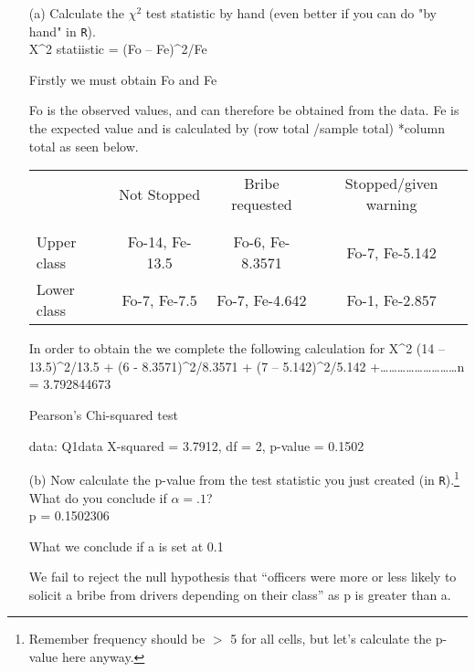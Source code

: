 \documentclass[12pt,letterpaper]{article}
\begin{document}
\begin{enumerate}
	
	\item [(a)]
	Calculate the $\chi^2$ test statistic by hand (even better if you can do "by hand" in \texttt{R}).\\
	\vspace{1cm}
	 X^2 statiistic = (Fo – Fe)^2/Fe 
	 
	 Firstly we must obtain Fo and Fe 
	 
	 Fo is the  observed values, and can therefore be obtained from the data. 
	 Fe is the expected value and is calculated by (row total /sample total) *column total as seen below. 
	
 \begin{table}[h!]
	 	\centering
	 	\begin{tabular}{l | c c c }
	 		& Not Stopped & Bribe requested & Stopped/given warning \\
	 		\\[-1.8ex] 
	 		\hline \\[-1.8ex]
	 		Upper class & Fo-14, Fe-13.5 & Fo-6, Fe-8.3571 & Fo-7, Fe-5.142 \\
	 		Lower class & Fo-7, Fe-7.5 & Fo-7, Fe-4.642 & Fo-1, Fe-2.857 \\
	 		\hline
	 	\end{tabular}
	 \end{table}
 
 In order to obtain the we complete the following calculation for X^2
 (14 – 13.5)^2/13.5 + (6 - 8.3571)^2/8.3571 + (7 – 5.142)^2/5.142 +………………………n
 = 3.792844673

  
 
	 	Pearson's Chi-squared test
	 
	 data:  Q1data
	 X-squared = 3.7912, df = 2, p-value = 0.1502
	
	\item [(b)]
	Now calculate the p-value from the test statistic you just created (in \texttt{R}).\footnote{Remember frequency should be $>$ 5 for all cells, but let's calculate the p-value here anyway.}  What do you conclude if $\alpha = .1$?\\



p  = 0.1502306	

What we conclude if a is set at 0.1

We fail to reject the null hypothesis that “officers were more or less likely to solicit a bribe from drivers depending on their class” as p is greater than a.


\end{enumerate}
\end{document}
